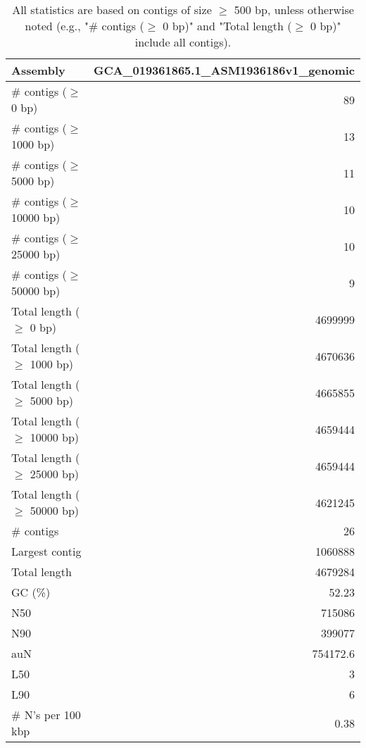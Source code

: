 \documentclass[12pt,a4paper]{article}
\begin{document}
\begin{table}[ht]
\begin{center}
\caption{All statistics are based on contigs of size $\geq$ 500 bp, unless otherwise noted (e.g., "\# contigs ($\geq$ 0 bp)" and "Total length ($\geq$ 0 bp)" include all contigs).}
\begin{tabular}{|l*{1}{|r}|}
\hline
Assembly & GCA\_019361865.1\_ASM1936186v1\_genomic \\ \hline
\# contigs ($\geq$ 0 bp) & 89 \\ \hline
\# contigs ($\geq$ 1000 bp) & 13 \\ \hline
\# contigs ($\geq$ 5000 bp) & 11 \\ \hline
\# contigs ($\geq$ 10000 bp) & 10 \\ \hline
\# contigs ($\geq$ 25000 bp) & 10 \\ \hline
\# contigs ($\geq$ 50000 bp) & 9 \\ \hline
Total length ($\geq$ 0 bp) & 4699999 \\ \hline
Total length ($\geq$ 1000 bp) & 4670636 \\ \hline
Total length ($\geq$ 5000 bp) & 4665855 \\ \hline
Total length ($\geq$ 10000 bp) & 4659444 \\ \hline
Total length ($\geq$ 25000 bp) & 4659444 \\ \hline
Total length ($\geq$ 50000 bp) & 4621245 \\ \hline
\# contigs & 26 \\ \hline
Largest contig & 1060888 \\ \hline
Total length & 4679284 \\ \hline
GC (\%) & 52.23 \\ \hline
N50 & 715086 \\ \hline
N90 & 399077 \\ \hline
auN & 754172.6 \\ \hline
L50 & 3 \\ \hline
L90 & 6 \\ \hline
\# N's per 100 kbp & 0.38 \\ \hline
\end{tabular}
\end{center}
\end{table}
\end{document}
